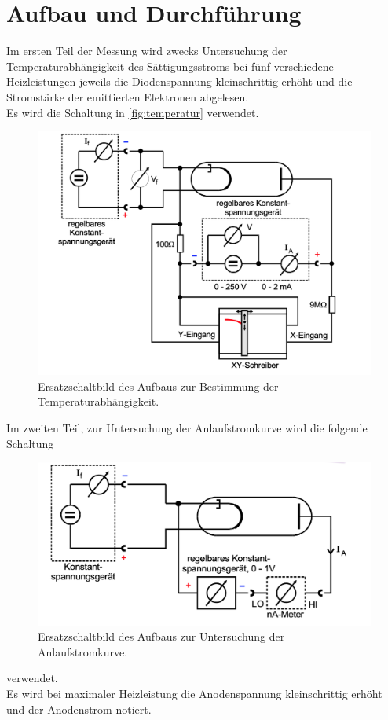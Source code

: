 \section{Aufbau und Durchführung}
\label{sec:Durchführung}
Im ersten Teil der Messung wird zwecks Untersuchung der 
Temperaturabhängigkeit des Sättigungsstroms bei fünf verschiedene
Heizleistungen jeweils die Diodenspannung kleinschrittig erhöht
und die Stromstärke der emittierten Elektronen abgelesen.\\
Es wird die Schaltung in \autoref{fig:temperatur} verwendet.\\

\begin{figure}[h]
    \centering
    \includegraphics[width=\textwidth]{content/Aufbau1}
    \caption{Ersatzschaltbild des Aufbaus zur Bestimmung der Temperaturabhängigkeit.\cite{sample}}
    \label{fig:temperatur}
\end{figure}

Im zweiten Teil, zur Untersuchung der Anlaufstromkurve wird die folgende Schaltung 
\begin{figure}[h]
    \centering
    \includegraphics[width=\textwidth]{content/Aufbau2}
    \caption{Ersatzschaltbild des Aufbaus zur Untersuchung der Anlaufstromkurve.\cite{sample}}
    \label{fig:anlauf}
\end{figure}
verwendet. \\
Es wird bei maximaler Heizleistung die Anodenspannung kleinschrittig
erhöht und der Anodenstrom notiert. \\

